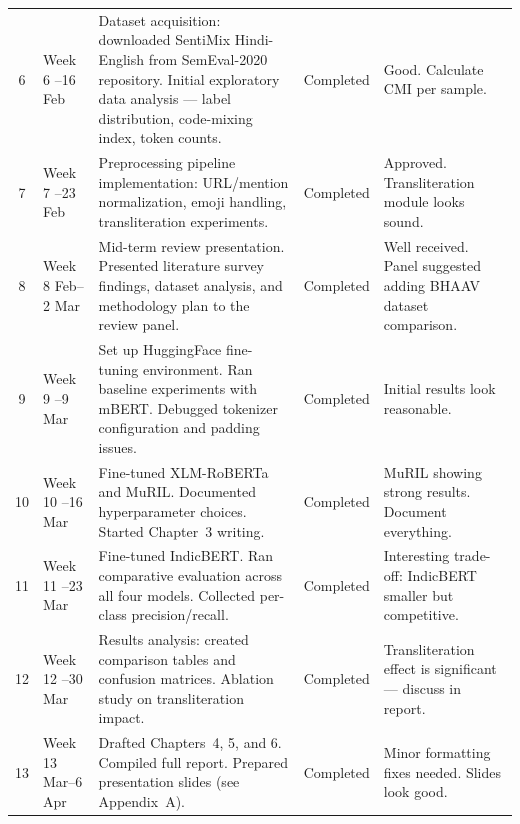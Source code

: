 \documentclass[12pt,a4paper]{report}
\newcommand{\progressdone}{\textcolor{accent2}{\faCheckCircle}\hspace{2pt}Completed}
\begin{document}
\begin{longtable}{@{}c >{\raggedright}p{2.2cm} >{\raggedright}p{6cm} >{\raggedright}p{2.2cm} >{\raggedright\arraybackslash}p{2.5cm}@{}}
\rowcolor{white}    6  & Week 6 \newline 10--16 Feb    & Dataset acquisition: downloaded SentiMix Hindi-English from SemEval-2020 repository. Initial exploratory data analysis — label distribution, code-mixing index, token counts. & \progressdone  & Good. Calculate CMI per sample. \\
\rowcolor{black!4} 7  & Week 7 \newline 17--23 Feb    & Preprocessing pipeline implementation: URL/mention normalization, emoji handling, transliteration experiments.                                        & \progressdone  & Approved. Transliteration module looks sound. \\
\rowcolor{white}    8  & Week 8 \newline 24 Feb--2 Mar & Mid-term review presentation. Presented literature survey findings, dataset analysis, and methodology plan to the review panel.                       & \progressdone  & Well received. Panel suggested adding BHAAV dataset comparison. \\
\rowcolor{black!4} 9  & Week 9 \newline 3--9 Mar      & Set up HuggingFace fine-tuning environment. Ran baseline experiments with mBERT. Debugged tokenizer configuration and padding issues.                 & \progressdone  & Initial results look reasonable. \\
\rowcolor{white}    10 & Week 10 \newline 10--16 Mar   & Fine-tuned XLM-RoBERTa and MuRIL. Documented hyperparameter choices. Started Chapter~3 writing.                                                       & \progressdone  & MuRIL showing strong results. Document everything. \\
\rowcolor{black!4} 11 & Week 11 \newline 17--23 Mar   & Fine-tuned IndicBERT. Ran comparative evaluation across all four models. Collected per-class precision/recall.                                        & \progressdone  & Interesting trade-off: IndicBERT smaller but competitive. \\
\rowcolor{white}    12 & Week 12 \newline 24--30 Mar   & Results analysis: created comparison tables and confusion matrices. Ablation study on transliteration impact.                                         & \progressdone  & Transliteration effect is significant — discuss in report. \\
\rowcolor{black!4} 13 & Week 13 \newline 31 Mar--6 Apr & Drafted Chapters~4, 5, and 6. Compiled full report. Prepared presentation slides (see Appendix~A).                                                    & \progressdone  & Minor formatting fixes needed. Slides look good. \\

\end{longtable}
\end{document}
